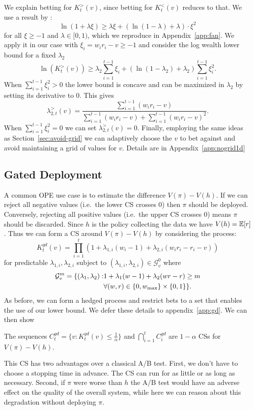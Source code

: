 We explain betting for $K_t^{>}(v)$, since betting for $K_t^{<}(v)$ reduces to
that.  We use a result by \citet{fan2015exponential}:
\[
\ln(1+\lambda \xi) \geq \lambda \xi+\left(\ln\left(1-\lambda\right)+\lambda\right)\cdot \xi^{2}
\]
for all $\xi\geq -1$ and $\lambda \in [0,1)$, which we reproduce in
Appendix~\ref{app:fan}.  We apply it in our case with $\xi_i=w_ir_i-v\geq -1$
and consider the log wealth lower bound for a fixed $\lambda_2$
\[
\ln(K_t^{>}(v)) \geq \lambda_2 \sum_{i=1}^{t-1} \xi_i + \left(\ln\left(1-\lambda_2\right)+\lambda_2\right) \sum_{i=1}^{t-1} \xi_i^2.
\]
When $\sum_{i=1}^{t-1} \xi_i^2>0$ the lower bound is concave and can 
be maximized in $\lambda_2$ by setting its derivative to 0. This gives
\[
\lambda_{2,t}^{>}(v) = \frac{\sum_{i=1}^{t-1} (w_i r_i -v)}{\sum_{i=1}^{t-1} (w_i r_i -v)+\sum_{i=1}^{t-1} (w_i r_i -v)^2}.
\]
When $\sum_{i=1}^{t-1} \xi_i^2=0$ we can set $\lambda_{2,t}^{>}(v)=0$.
Finally, employing the same ideas as Section~\ref{sec:avoid-grid} we can
adaptively choose the $v$ to bet against and avoid maintaining a grid of values
for $v$. Details are in Appendix~\ref{app:nogrid1d}



\subsection{Gated Deployment}
A common OPE use case is to estimate the difference $V(\pi) - V(h)$. If we
can reject all negative values (i.e.\ the lower CS crosses 0) then $\pi$ should be deployed. Conversely,
rejecting all positive values (i.e.\ the upper CS crosses 0) means $\pi$ should be discarded. Since $h$ is the policy collecting the data we have $V(h)=\mathbb{E}[r]$. Thus we can form a CS 
around $V(\pi) - V(h)$ by considering the process:
\[
K_t^{gd}(v) = \prod_{i=1}^t \left(1+\lambda_{1,i} (w_i-1) + \lambda_{2,i}(w_ir_i -r_i -v)\right)  
\]
for predictable $\lambda_{1,i},\lambda_{2,i}$ subject to $(\lambda_{1,i},\lambda_{2,i}) \in \mathcal{G}_{v}^0$
where
\begin{align}
\label{eq:gd-domain}
\mathcal{G}_{v}^m = \{(\lambda_{1},\lambda_{2}): & 1+\lambda_1(w-1)+\lambda_2(wr-r)\geq m \notag\\
                         & \forall (w,r) \in \{0,w_{\max}\}\times \{0,1\}
\}.
\end{align}
As before, we can form a hedged process and restrict bets to a set that
enables the use of our lower bound. We defer these details to 
appendix~\ref{app:gd}. We can then show
\begin{theorem}
\label{thm:gated}
The sequences $C_t^{gd} = \{v:K_t^{gd}(v)\leq \frac{1}{\alpha}\}$ and $\bigcap_{i=1}^t C_i^{gd}$
are $1-\alpha$ CSs for $V(\pi)-V(h)$.
\end{theorem}
This CS has two advantages 
over a classical A/B test. First, we don't have to 
choose a stopping time in advance. The CS can run for
as little or as long as necessary. Second, if $\pi$ were
worse than $h$ the A/B test would have an adverse effect
on the quality of the overall system, while here we can
reason about this degradation without deploying $\pi$.

